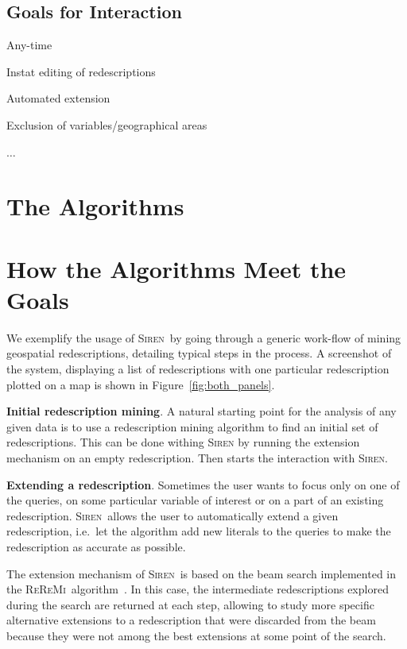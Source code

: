 \documentclass{llncs}
\newcommand{\prg}[1]{\textbf{#1}.}
\renewcommand{\note}[1]{{\color{red}{#1}\par}}
\newcommand{\Siren}{\textsc{Siren}}
\newcommand{\ReReMi}{\textsc{ReReMi}}
\begin{document}
\subsection{Goals for Interaction}
\label{sec:goals-interaction}
\note{just some buzzwords now}

Any-time

Instat editing of redescriptions

Automated extension

Exclusion of variables/geographical areas

$\ldots$



\section{The Algorithms}
\label{sec:algorithms}

\note{All explanations about the workings of ReReMi \& Siren here}

\section{How the Algorithms Meet the Goals}
\label{sec:scenarios}

\note{The old use-case scenario text is a good basis for this, but
  needs to be re-worked a lot.}
We exemplify the usage of \Siren\ by going through a generic work-flow of
mining geospatial redescriptions, detailing typical steps in the process.  A screenshot of the system,
displaying a list of redescriptions with one
particular redescription plotted on a map is shown in
Figure~\ref{fig:both_panels}.

\prg{Initial redescription mining} A natural starting point for the
analysis of any given data is to use a redescription mining algorithm
to find an initial set of redescriptions.
This can be done withing \Siren{} by running the extension mechanism on an empty redescription.
Then starts the interaction with \Siren.

 
\prg{Extending a redescription} Sometimes the user wants to focus only
on one of the queries, on some particular variable of interest or on a
part of an existing redescription.  \Siren\ allows the user to
automatically extend a given redescription, i.e.\ let the algorithm
add new literals to the queries to make the redescription as accurate
as possible.

The extension mechanism of \Siren\ is based on the beam search
implemented in the \ReReMi\ algorithm~\cite{galbrun11black}. In this case, the intermediate redescriptions
explored during the search are returned at each step, allowing to study
more specific alternative extensions to a redescription that were discarded from the beam
because they were not among the best extensions at some point of the search.
\end{document}
